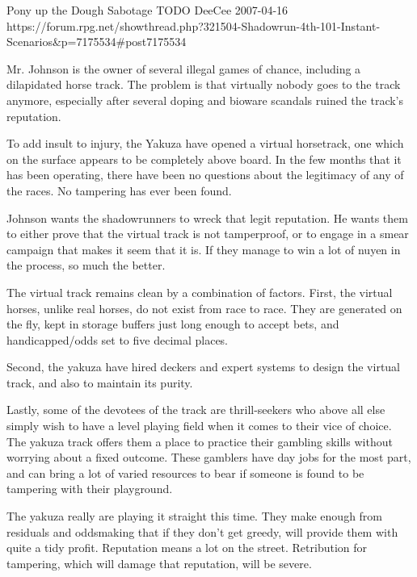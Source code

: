 \begin{scenario}{Pony up the Dough}
	{Sabotage}
	{TODO}
	{DeeCee}
	{2007-04-16}
	{https://forum.rpg.net/showthread.php?321504-Shadowrun-4th-101-Instant-Scenarios\&p=7175534\#post7175534}

Mr. Johnson is the owner of several illegal games of chance, including a dilapidated horse track. The problem is that virtually nobody goes to the track anymore, especially after several doping and bioware scandals ruined the track's reputation.

To add insult to injury, the Yakuza have opened a virtual horsetrack, one which on the surface appears to be completely above board. In the few months that it has been operating, there have been no questions about the legitimacy of any of the races. No tampering has ever been found.

Johnson wants the shadowrunners to wreck that legit reputation. He wants them to either prove that the virtual track is not tamperproof, or to engage in a smear campaign that makes it seem that it is. If they manage to win a lot of nuyen in the process, so much the better.

\synopsis The virtual track remains clean by a combination of factors. First, the virtual horses, unlike real horses, do not exist from race to race. They are generated on the fly, kept in storage buffers just long enough to accept bets, and handicapped/odds set to five decimal places.

Second, the yakuza have hired deckers and expert systems to design the virtual track, and also to maintain its purity.

Lastly, some of the devotees of the track are thrill-seekers who above all else simply wish to have a level playing field when it comes to their vice of choice. The yakuza track offers them a place to practice their gambling skills without worrying about a fixed outcome. These gamblers have day jobs for the most part, and can bring a lot of varied resources to bear if someone is found to be tampering with their playground.

\notes The yakuza really are playing it straight this time. They make enough from residuals and oddsmaking that if they don't get greedy, will provide them with quite a tidy profit. Reputation means a lot on the street. Retribution for tampering, which will damage that reputation, will be severe. 

\end{scenario}
